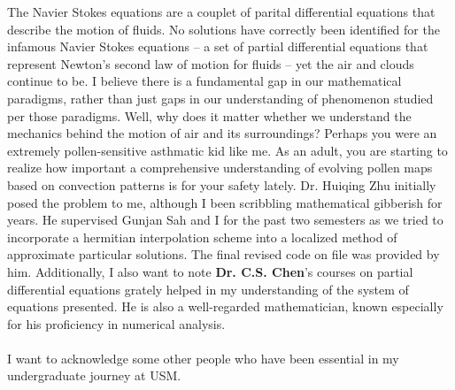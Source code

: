 \documentclass{article}
\begin{document}
The Navier Stokes equations are a couplet of parital differential equations that describe the motion of fluids. No solutions have correctly been identified for the infamous Navier Stokes equations – a set of partial differential equations that represent Newton’s second law of motion for fluids – yet the air and clouds continue to be. I believe there is a fundamental gap in our mathematical paradigms, rather than just gaps in our understanding of phenomenon studied per those paradigms. Well, why does it matter whether we understand the mechanics behind the motion of air and its surroundings? Perhaps you were an extremely pollen-sensitive asthmatic kid like me. As an adult, you are starting to realize how important a comprehensive understanding of evolving pollen maps based on convection patterns is for your safety lately. Dr. Huiqing Zhu initially posed the problem to me, although I been scribbling mathematical gibberish for years. He supervised Gunjan Sah and I for the past two semesters as we tried to incorporate a hermitian interpolation scheme into a localized method of approximate particular solutions. The final revised code on file was provided by him. Additionally, I also want to note \textbf{Dr. C.S. Chen}'s courses on partial differential equations grately helped in my understanding of the system of equations presented. He is also a well-regarded mathematician, known especially for his proficiency in numerical analysis.\\ \\ 
I want to acknowledge some other people who have been essential in my undergraduate journey at USM. 
\end{document}
